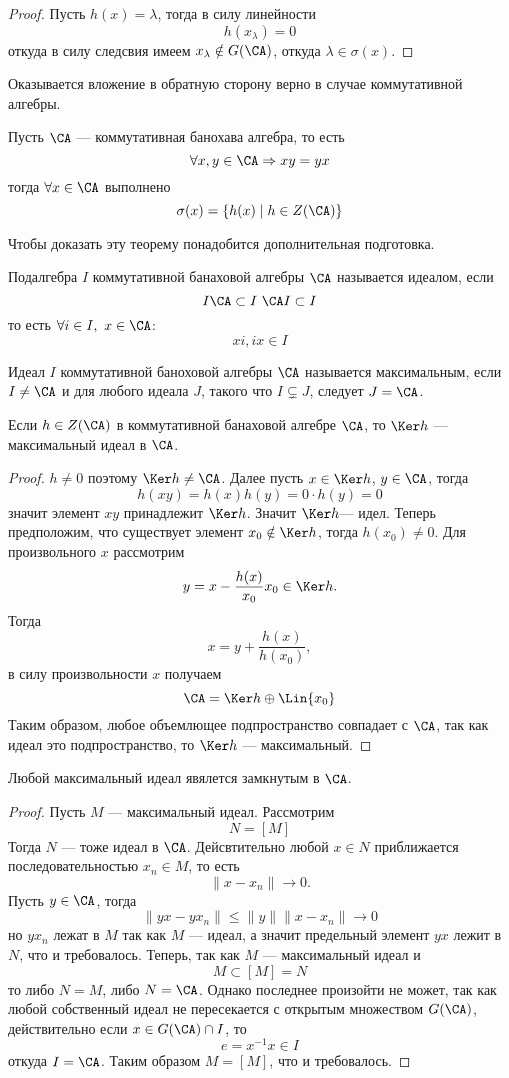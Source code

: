 \begin{proof}
	Пусть $h(x) = \lambda$, тогда в силу линейности
	$$
	h(x_\lambda) = 0
	$$
	откуда в силу следсвия имеем $x_\lambda \notin G(\CA)$, откуда $\lambda \in \sigma(x)$. 
\end{proof}
Оказывается вложение в обратную сторону верно в случае коммутативной алгебры.
\begin{theorem}[Гельфанд]
	Пусть $\CA$ --- коммутативная банохава алгебра, то есть 
	$$
	\forall x,y \in \CA  \Rightarrow  xy = yx
	$$
	тогда $\forall x \in \CA$ выполнено 
	$$
	\sigma(x) = \{h(x) \mid h \in Z(\CA)\}
	$$
\end{theorem}
Чтобы доказать эту теорему понадобится дополнительная подготовка. 
\begin{definition}
	Подалгебра $I$ коммутативной банаховой алгебры $\CA$ называется идеалом, если 
	$$
	I\CA \subset I \ \CA I \subset I
	$$
	то есть $\forall i \in I, \ x \in \CA$: 
	$$
	xi, ix \in I
	$$
\end{definition}
\begin{definition}
	Идеал $I$ коммутативной баноховой алгебры $\CA$ называется максимальным, если $I \neq \CA$ и для любого идеала $J$, такого что $I\subsetneq J$, следует $J= \CA$.
\end{definition}
\begin{lemma}
	Если $h \in Z(\CA)$ в коммутативной банаховой алгебре $\CA$, то $\Ker h$ --- максимальный идеал в $\CA$.
\end{lemma}
\begin{proof}
	$h \neq 0$ поэтому $\Ker h \neq \CA$. Далее пусть $x \in \Ker h$, $y \in \CA$, тогда 
	$$
	h(xy) = h(x) h(y) = 0 \cdot h(y) = 0
	$$
	значит элемент $xy$ принадлежит $\Ker h$. Значит $\Ker h$--- идел. Теперь предположим, что существует элемент $x_0 \notin \Ker h$, тогда $h(x_0) \neq 0$. Для произвольного $x$ рассмотрим 
	$$
	y = x - \frac{h(x)}{x_0} x_0 \in \Ker h.
	$$
	Тогда 
	$$
	x = y + \frac{h(x)}{h(x_0)},
	$$
	в силу произвольности $x$ получаем 
	$$
	\CA = \Ker h \oplus \Lin \{x_0\}
	$$
	Таким образом, любое объемлющее подпространство совпадает с $\CA$, так как идеал это подпространство, то $\Ker h$ --- максимальный. 
\end{proof}
\begin{lemma}
	Любой максимальный идеал явялется замкнутым в $\CA$. 
\end{lemma}
\begin{proof}
	Пусть $M$ --- максимальный идеал. Рассмотрим
	$$
	N = [M]
	$$
	Тогда $N$ --- тоже идеал в $\CA$. Дейсвтительно любой $x \in N$ приближается последовательностью $x_n \in M$, то есть
	$$
	\|x - x_n\| \to 0.
	$$
	Пусть $y \in \CA$, тогда 
	$$
	\|yx - yx_n\| \leq \|y\| \|x - x_n\| \to 0
	$$
	но $y x_n$ лежат в $M$ так как $M$ --- идеал, а значит предельный элемент $yx$ лежит в $N$, что и требовалось. Теперь, так как $M$ --- максимальный идеал и
	$$
	M \subset [M] = N
	$$
	то либо $N = M$, либо $N = \CA$. Однако последнее произойти не может, так как любой собственный идеал не пересекается с открытым множеством $G(\CA)$, действительно если $ x \in G(\CA) \cap I$, то 
	$$
	e = x^{-1} x \in I
	$$
	откуда $I = \CA$. Таким образом $M = [M]$, что и требовалось.
\end{proof}
